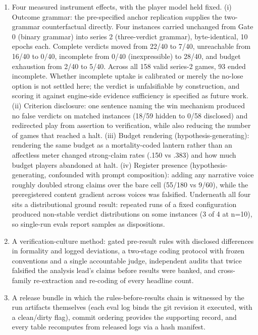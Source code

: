 \documentclass[11pt]{article}
\providecommand{\tightlist}{\setlength{\itemsep}{0pt}\setlength{\parskip}{0pt}}
\begin{document}
\begin{enumerate}
\def\labelenumi{\arabic{enumi}.}
\tightlist
\item[1.]
  Four measured instrument effects, with the player model held fixed.
  (i) Outcome grammar: the pre-specified anchor replication supplies the
  two-grammar counterfactual directly. Four instances carried unchanged
  from Gate 0 (binary grammar) into series 2 (three-verdict grammar),
  byte-identical, 10 epochs each. Complete verdicts moved from 22/40 to
  7/40, unreachable from 16/40 to 0/40, incomplete from 0/40
  (inexpressible) to 28/40, and budget exhaustion from 2/40 to 5/40.
  Across all 158 valid series-2 games, 93 ended incomplete. Whether
  incomplete uptake is calibrated or merely the no-lose option is not
  settled here; the verdict is unfalsifiable by construction, and
  scoring it against engine-side evidence sufficiency is specified as
  future work. (ii) Criterion disclosure: one sentence naming the win
  mechanism produced no false verdicts on matched instances (18/59
  hidden to 0/58 disclosed) and redirected play from assertion to
  verification, while also reducing the number of games that reached a
  halt. (iii) Budget rendering (hypothesis-generating): rendering the
  same budget as a mortality-coded lantern rather than an affectless
  meter changed strong-claim rates (.150 vs .383) and how much budget
  players abandoned at halt. (iv) Register presence
  (hypothesis-generating, confounded with prompt composition): adding
  any narrative voice roughly doubled strong claims over the bare cell
  (55/180 vs 9/60), while the preregistered content gradient across
  voices was falsified. Underneath all four sits a distributional ground
  result: repeated runs of a fixed configuration produced non-stable
  verdict distributions on some instances (3 of 4 at n=10), so
  single-run evals report samples as dispositions.
\item[2.]
  A verification-culture method: gated pre-result rules with disclosed
  differences in formality and logged deviations, a two-stage coding
  protocol with frozen conventions and a single accountable judge,
  independent audits that twice falsified the analysis lead's claims
  before results were banked, and cross-family re-extraction and
  re-coding of every headline count.
\item[3.]
  A release bundle in which the rules-before-results chain is witnessed
  by the run artifacts themselves (each eval log binds the git revision
  it executed, with a clean/dirty flag), commit ordering provides the
  supporting record, and every table recomputes from released logs via a
  hash manifest.
\end{enumerate}
\end{document}
